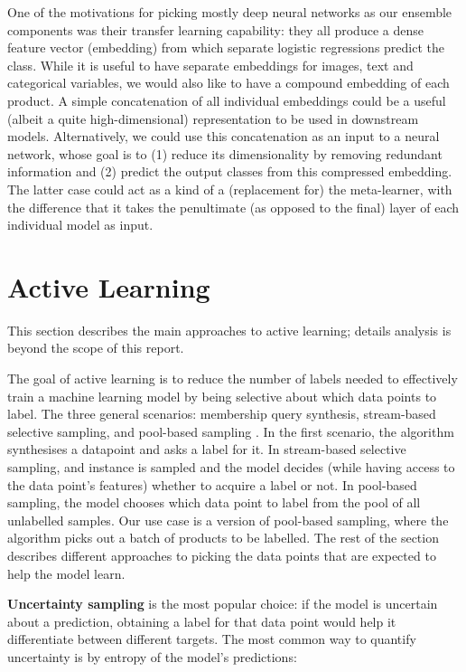 One of the motivations for picking mostly deep neural networks as our ensemble components was their transfer learning capability: they all produce a dense feature vector (embedding) from which separate logistic regressions predict the class.
While it is useful to have separate embeddings for images, text and categorical variables, we would also like to have a compound embedding of each product.
A simple concatenation of all individual embeddings could be a useful (albeit a quite high-dimensional) representation to be used in downstream models.
Alternatively, we could use this concatenation as an input to a neural network, whose goal is to (1) reduce its dimensionality by removing redundant information and (2) predict the output classes from this compressed embedding.
The latter case could act as a kind of a (replacement for) the meta-learner, with the difference that it takes the penultimate (as opposed to the final) layer of each individual model as input.


\section{Active Learning}
\label{bg_al} 

This section describes the main approaches to active learning;  details analysis is beyond the scope of this report.


The goal of active learning is to reduce the number of labels needed  to effectively train a machine learning model by  being selective about which data points to label.
The three general scenarios: membership query synthesis, stream-based selective sampling, and pool-based sampling \cite{al_survey}.
In the first scenario, the algorithm synthesises a datapoint and asks a label for it.
In stream-based selective sampling, and instance is sampled and  the model decides (while having access to the data point's features) whether to acquire a label or not.
In pool-based sampling, the model chooses which data point to label from the pool of all unlabelled samples.
Our use case is a version of pool-based sampling, where the algorithm picks out a batch of products to be labelled.
The rest of the section describes different approaches to picking the data points that are expected to help the model learn.

\textbf{Uncertainty sampling} is the most popular choice: if the model is uncertain about a prediction, obtaining a label for that data point would help it differentiate between different targets.
The most common way to quantify uncertainty is by entropy of the model's predictions:

